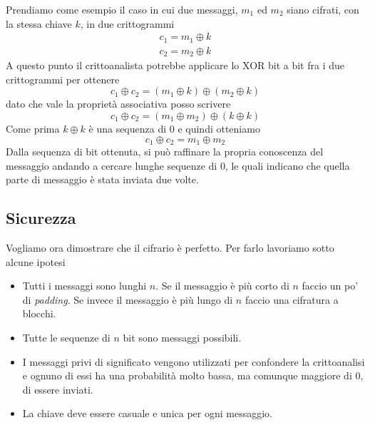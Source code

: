 Prendiamo come esempio il caso in cui due messaggi, $m_1$ ed $m_2$ siano cifrati, con la stessa chiave $k$, in due
crittogrammi
\begin{gather*}
	c_1 = m_1 \oplus k \\
	c_2 = m_2 \oplus k
\end{gather*}
A questo punto il crittoanalista potrebbe applicare lo XOR bit a bit fra i due crittogrammi per ottenere
\[ c_1 \oplus c_2 = (m_1 \oplus k) \oplus (m_2 \oplus k) \]
dato che vale la propriet\`a associativa posso scrivere
\[ c_1 \oplus c_2 = (m_1 \oplus m_2) \oplus (k \oplus k) \]
Come prima $k \oplus k$ \`e una sequenza di 0 e quindi otteniamo
\[ c_1 \oplus c_2 = m_1 \oplus m_2 \]
Dalla sequenza di bit ottenuta, si pu\`o raffinare la propria conoscenza del messaggio andando a cercare lunghe sequenze
di 0, le quali indicano che quella parte di messaggio \`e stata inviata due volte.

\subsection{Sicurezza}\label{sicurezza_otp}
Vogliamo ora dimostrare che il cifrario \`e perfetto. Per farlo lavoriamo sotto alcune ipotesi
\begin{itemize}
	\item Tutti i messaggi sono lunghi $n$. Se il messaggio \`e pi\`u corto di $n$ faccio un po' di \emph{padding}.
	      Se invece il messaggio \`e pi\`u lungo di $n$ faccio una cifratura a blocchi.
	\item Tutte le sequenze di $n$ bit sono messaggi possibili.
	\item I messaggi privi di significato vengono utilizzati per confondere la crittoanalisi e ognuno di essi ha una
	      probabilit\`a molto bassa, ma comunque maggiore di 0, di essere inviati.
	\item La chiave deve essere casuale e unica per ogni messaggio.
\end{itemize}

